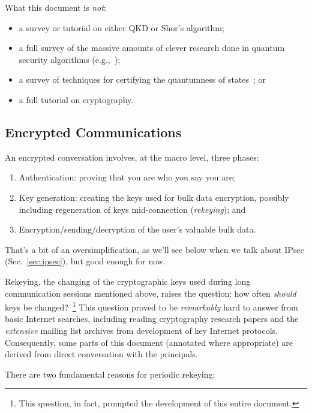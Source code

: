 What this document is \emph{not}:

\begin{itemize}
\item a survey or tutorial on either QKD or Shor's algorithm;
\item a full survey of the massive amounts of clever research done in
  quantum security algorithms
  (e.g.,~\cite{PhysRevA.100.052326,buhrman14:_posit_based_quant_crypt,ben-or2005fast,Crepeau:2002:SMQ:509907.510000});
\item a survey of techniques for certifying the quantumness of states~\cite{eisert2019cert}; or
\item a full tutorial on cryptography.
\end{itemize}

\subsection{Encrypted Communications}

An encrypted conversation involves, at the macro level, three phases:

\begin{enumerate}
\item Authentication: proving that you are who you say you are;
\item Key generation: creating the keys used for bulk data encryption,
  possibly including regeneration of keys mid-connection
  (\emph{rekeying}); and
\item Encryption/sending/decryption of the user's valuable bulk data.
\end{enumerate}

That's a bit of an oversimplification, as we'll see below when we talk
about IPsec (Sec.~\ref{sec:ipsec}), but good enough for now.

Rekeying, the changing of the cryptographic keys used during long
communication sessions mentioned above, raises the question: how often
\emph{should} keys be changed?~\footnote{This question, in fact,
  prompted the development of this entire document.}  This question
proved to be \emph{remarkably} hard to answer from basic Internet
searches, including reading cryptography research papers and the
\emph{extensive} mailing list archives from development of key
Internet protocols.  Consequently, some parts of this document
(annotated where appropriate) are derived from direct conversation
with the principals.

There are two fundamental reasons for periodic rekeying:

